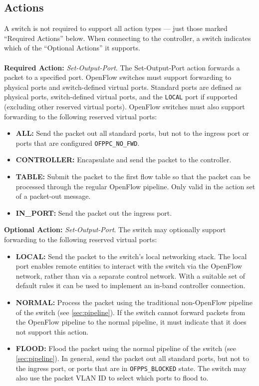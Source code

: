 \documentclass[10pt]{article}
\begin{document}
\subsection{Actions}
\label{ft:actions}
A switch is not required to support all action types --- just those marked ``Required Actions'' below. When connecting to the controller, a switch indicates which of the ``Optional Actions'' it supports.
\\\\
\textbf{Required Action:} \textit{Set-Output-Port}.
The Set-Output-Port action forwards a packet to a specified port. OpenFlow switches must support forwarding to physical ports and switch-defined virtual ports. Standard ports are defined as physical ports, switch-defined virtual ports, and the \verb|LOCAL| port if supported (excluding other reserved virtual ports). OpenFlow switches must also support forwarding to the following reserved virtual ports:
\begin{itemize}
\item \textbf{ALL:} Send the packet out all standard ports, but not to the ingress port or ports that are configured \verb|OFPPC_NO_FWD|.
\item \textbf{CONTROLLER:} Encapsulate and send the packet to the controller.
\item \textbf{TABLE:} Submit the packet to the first flow table so that the packet can be processed through the regular OpenFlow pipeline.  Only valid in the action set of a packet-out message.
\item \textbf{IN\_PORT:} Send the packet out the ingress port. 
\end{itemize}
\textbf{Optional Action:} \textit{Set-Output-Port}.
The switch may optionally support forwarding to the following reserved virtual ports:
\begin{itemize}
\item \textbf{LOCAL:} Send the packet to the switch's local networking stack. The local port enables remote entities to interact with the switch via the OpenFlow network, rather than via a separate control network. With a suitable set of default rules it can be used to implement an in-band controller connection.
\item \textbf{NORMAL:} Process the packet using the traditional non-OpenFlow pipeline of the switch (see \ref{sec:pipeline}). If the switch cannot forward packets from the OpenFlow pipeline to the normal pipeline, it must indicate that it does not support this action.
\item \textbf{FLOOD:} Flood the packet using the normal pipeline of the switch (see \ref{sec:pipeline}). In general, send the packet out all standard ports, but not to the ingress port, or ports that are in \verb|OFPPS_BLOCKED| state. The switch may also use the packet VLAN ID to select which ports to flood to.

\end{itemize}
\end{document}
